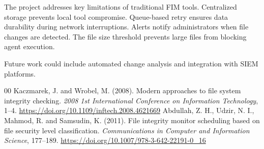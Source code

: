 \documentclass[conference]{IEEEtran}
\begin{document}
The project addresses key limitations of traditional FIM tools. Centralized storage prevents local tool compromise. Queue-based retry ensures data durability during network interruptions. Alerts notify administrators when file changes are detected. The file size threshold prevents large files from blocking agent execution.

Future work could include automated change analysis and integration with SIEM platforms.

\begin{thebibliography}{00}
     Kaczmarek, J. and Wrobel, M. (2008). Modern approaches to file system integrity checking. \textit{2008 1st International Conference on Information Technology}, 1--4. \url{https://doi.org/10.1109/inftech.2008.4621669}
     Abdullah, Z. H., Udzir, N. I., Mahmod, R. and Samsudin, K. (2011). File integrity monitor scheduling based on file security level classification. \textit{Communications in Computer and Information Science}, 177--189. \url{https://doi.org/10.1007/978-3-642-22191-0_16}
\end{thebibliography}
\end{document}

